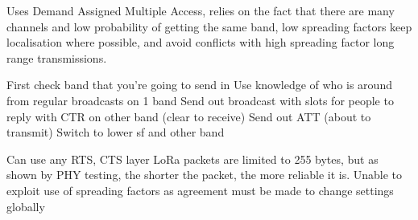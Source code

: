 Uses Demand Assigned Multiple Access, relies on the fact that there are many channels and low probability of getting the same band, low spreading factors keep localisation where possible, and avoid conflicts with high spreading factor long range transmissions.

First check band that you're going to send in
Use knowledge of who is around from regular broadcasts on 1 band
Send out broadcast with slots for people to reply with CTR on other band (clear to receive)
Send out ATT (about to transmit)
Switch to lower sf and other band







Can use any RTS, CTS layer
LoRa packets are limited to 255 bytes, but as shown by PHY testing, the shorter the packet, the more reliable it is.
Unable to exploit use of spreading factors as agreement must be made to change settings globally





